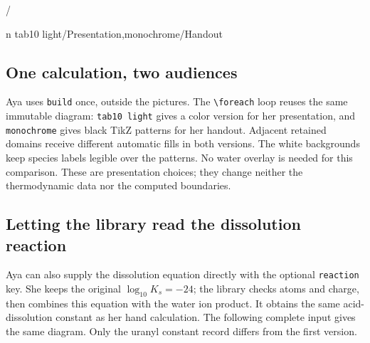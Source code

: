 \documentclass[a4paper,11pt]{ltxdoc}
\begin{document}
\begin{codeexample}[width=0pt]
\foreach \palette/\caption in
 {tab10 light/Presentation,monochrome/Handout}{
}
\end{codeexample}

\subsection{One calculation, two audiences}
Aya uses \texttt{build} once, outside the pictures. The \verb|\foreach| loop
reuses the same immutable diagram: \texttt{tab10 light} gives a color version
for her presentation, and \texttt{monochrome} gives black TikZ patterns for her
handout. Adjacent retained domains receive different automatic fills in both
versions. The white backgrounds keep species labels legible over the patterns.
No water overlay is needed for this comparison. These are presentation choices;
they change neither the thermodynamic data nor the computed boundaries.

\subsection{Letting the library read the dissolution reaction}
Aya can also supply the dissolution equation directly with the optional
\texttt{reaction} key. She keeps the original $\log_{10}K_s=-24$; the library
checks atoms and charge, then combines this equation with the water ion product.
It obtains the same acid-dissolution constant as her hand calculation.
The following complete input gives the same diagram. Only the uranyl constant
record differs from the first version.
\end{document}
